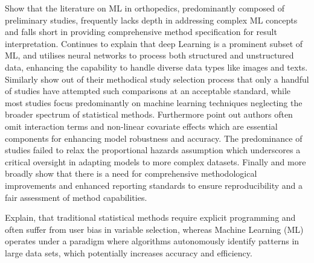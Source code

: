 \noindent \parencite{polce_guide_2023} Show that the literature on ML in orthopedics, predominantly composed of preliminary studies, frequently lacks depth in addressing complex ML concepts and falls short in providing comprehensive method specification for result interpretation. \parencite{polce_guide_2023} Continues to explain that deep Learning is a prominent subset of ML, and utilises neural networks to process both structured and unstructured data, enhancing the capability to handle diverse data types like images and texts. Similarly \parencite{smith_scoping_2022} show out of their methodical study selection process that only a handful of studies have attempted such comparisons at an acceptable standard, while most studies focus predominantly on machine learning techniques neglecting the broader spectrum of statistical methods. Furthermore \parencite{smith_scoping_2022} point out authors often omit interaction terms and non-linear covariate effects which are essential components for enhancing model robustness and accuracy. The predominance of studies failed to relax the proportional hazards assumption which underscores a critical oversight in adapting models to more complex datasets. Finally and more broadly \parencite{smith_scoping_2022} show that there is a need for comprehensive methodological improvements and enhanced reporting standards to ensure reproducibility and a fair assessment of method capabilities.

\parencite{polce_guide_2023} Explain, that traditional statistical methods require explicit programming and often suffer from user bias in variable selection, whereas Machine Learning (ML) operates under a paradigm where algorithms autonomously identify patterns in large data sets, which potentially increases accuracy and efficiency. 


